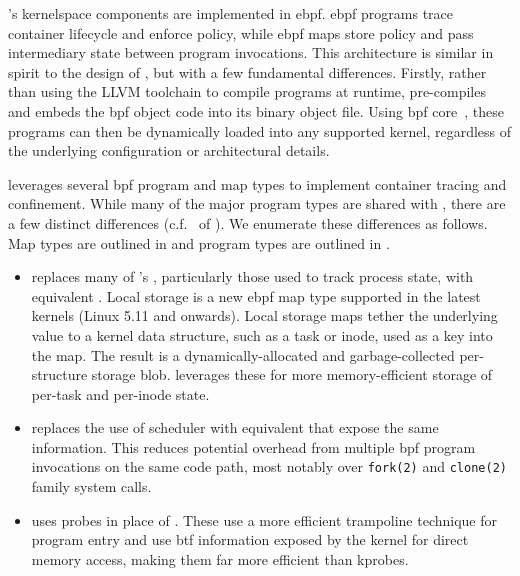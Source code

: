 \bpfcontain{}'s kernelspace components are implemented in \gls{ebpf}. \gls{ebpf} programs
trace container lifecycle and enforce policy, while \gls{ebpf} maps store policy and pass
intermediary state between program invocations. This architecture is similar in spirit to
the design of \bpfbox{}, but with a few fundamental differences. Firstly, rather than
using the LLVM toolchain to compile programs at runtime, \bpfcontain{} pre-compiles and
embeds the \gls{bpf} object code into its binary object file. Using \gls{bpf}
\gls{core}~\cite{nakryiko2020_core}, these programs can then be dynamically loaded into
any supported kernel, regardless of the underlying configuration or architectural details.

\bpfcontain{} leverages several \gls{bpf} program and map types to implement container
tracing and confinement. While many of the major program types are shared with \bpfbox{},
there are a few distinct differences (c.f.~ of
). We enumerate these differences as follows. Map types are outlined in
\textbf{} and program types are outlined in \textbf{}.
\begin{itemize}
  \item \bpfcontain{} replaces many of \bpfbox{}'s \textbf{},
  particularly those used to track process state, with equivalent \textbf{}. Local storage is a new \gls{ebpf} map type supported in the latest
  kernels (Linux 5.11 and onwards). Local storage maps tether the underlying value to
  a kernel data structure, such as a task or inode, used as a key into the map. The result
  is a dynamically-allocated and garbage-collected per-structure storage blob.
  \bpfcontain{} leverages these for more memory-efficient storage of per-task and
  per-inode state.

  \item \bpfcontain{} replaces the use of scheduler \textbf{} with
  equivalent \textbf{} that expose the same information. This
  reduces potential overhead from multiple \gls{bpf} program invocations on the same code
  path, most notably over \texttt{fork(2)} and \texttt{clone(2)} family system calls.

  \item \bpfcontain{} uses \textbf{} probes in place of
  \textbf{}. These use a more efficient trampoline technique for program
  entry and use \gls{btf} information exposed by the kernel for direct memory access,
  making them far more efficient than kprobes.
\end{itemize}

